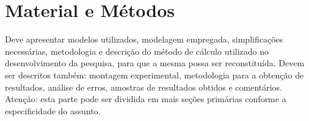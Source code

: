 
\graphicspath{%
  {./Chapter-3/}%
}

\chapter{Material e Métodos}%
\label{chpt:matl-meth}

Deve apresentar modelos utilizados, modelagem empregada, simplificações necessárias, metodologia e descrição do método de cálculo utilizado no desenvolvimento da pesquisa, para que a mesma possa ser reconstituída.
Devem ser descritos também: montagem experimental, metodologia para a obtenção de resultados, análise de erros, amostras de resultados obtidos e comentários.
Atenção: esta parte pode ser dividida em mais seções primárias conforme a especificidade do assunto.

